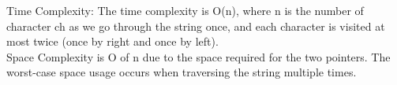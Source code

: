 \documentclass[preview]{standalone}
\begin{document}
Time Complexity: The time complexity is O(n), where n is the number of character ch as we go through the string once, and each character is visited at most twice (once by right and once by left).\\Space Complexity is O of n due to the space required for the two pointers. The worst-case space usage occurs when traversing the string multiple times.\\
\end{document}
